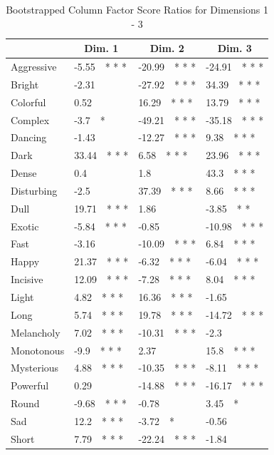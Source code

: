 \documentclass[
]{article}
\begin{document}
\begin{table}[tbp]

\begin{center}
\begin{threeparttable}

\caption{\label{tab:A.bootj.table}Bootstrapped Column Factor Score Ratios for Dimensions 1 - 3}

\begin{tabular}{llll}
\toprule
 & \multicolumn{1}{c}{Dim.  1} & \multicolumn{1}{c}{Dim.  2} & \multicolumn{1}{c}{Dim.  3}\\
\midrule
Aggressive & -5.55\ \ * * * & -20.99\ \ * * * & -24.91\ \ * * *\\
Bright & -2.31 & -27.92\ \ * * * & 34.39\ \ * * *\\
Colorful & 0.52 & 16.29\ \ * * * & 13.79\ \ * * *\\
Complex & -3.7\ \ * & -49.21\ \ * * * & -35.18\ \ * * *\\
Dancing & -1.43 & -12.27\ \ * * * & 9.38\ \ * * *\\
Dark & 33.44\ \ * * * & 6.58\ \ * * * & 23.96\ \ * * *\\
Dense & 0.4 & 1.8 & 43.3\ \ * * *\\
Disturbing & -2.5 & 37.39\ \ * * * & 8.66\ \ * * *\\
Dull & 19.71\ \ * * * & 1.86 & -3.85\ \ * *\\
Exotic & -5.84\ \ * * * & -0.85 & -10.98\ \ * * *\\
Fast & -3.16 & -10.09\ \ * * * & 6.84\ \ * * *\\
Happy & 21.37\ \ * * * & -6.32\ \ * * * & -6.04\ \ * * *\\
Incisive & 12.09\ \ * * * & -7.28\ \ * * * & 8.04\ \ * * *\\
Light & 4.82\ \ * * * & 16.36\ \ * * * & -1.65\\
Long & 5.74\ \ * * * & 19.78\ \ * * * & -14.72\ \ * * *\\
Melancholy & 7.02\ \ * * * & -10.31\ \ * * * & -2.3\\
Monotonous & -9.9\ \ * * * & 2.37 & 15.8\ \ * * *\\
Mysterious & 4.88\ \ * * * & -10.35\ \ * * * & -8.11\ \ * * *\\
Powerful & 0.29 & -14.88\ \ * * * & -16.17\ \ * * *\\
Round & -9.68\ \ * * * & -0.78 & 3.45\ \ *\\
Sad & 12.2\ \ * * * & -3.72\ \ * & -0.56\\
Short & 7.79\ \ * * * & -22.24\ \ * * * & -1.84\\

\end{tabular}
\end{threeparttable}
\end{center}
\end{table}
\end{document}
